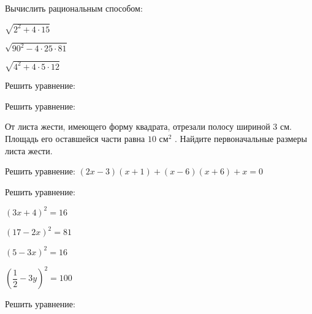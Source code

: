 \begin{class}[number=2]
	\begin{listofex}
	\item Вычислить рациональным способом:
	\begin{enumcols}[itemcolumns=3]
		\item \( \sqrt{2^2+4\cdot15} \)
		\item \( \sqrt{90^2-4\cdot25\cdot81} \)
		\item \( \sqrt{4^2+4\cdot5\cdot12} \)
	\end{enumcols}
	\item Решить уравнение:
	\begin{enumcols}[itemcolumns=3]
		\item {}
		\item {}
		\item {}
		\item {}
		\item {}
		\item {}
	\end{enumcols}
	\item Решить уравнение:
	\begin{enumcols}[itemcolumns=3]
		\item {}
		\item {}
		\item {}
		\item {}
		\item {}
		\item {}
	\end{enumcols}
	\item От листа жести, имеющего форму квадрата, отрезали полосу шириной \( 3 \) см. Площадь его оставшейся части равна \( 10 \) см\( ^2 \) . Найдите первоначальные размеры листа жести.
	\item Решить уравнение: \( (2x-3)(x+1)+(x-6)(x+6)+x=0 \)
	\item {}
	\item Решить уравнение:
		\begin{enumcols}[itemcolumns=3]
			\item \( (3x+4)^2=16 \)
			\item \( (17-2x)^2=81 \)
			\item \( (5-3x)^2=16 \)
			\item \( \left( \dfrac{1}{2}-3y \right)^2=100 \)
		\end{enumcols}
		\item Решить уравнение:

\end{listofex}
\end{class}
